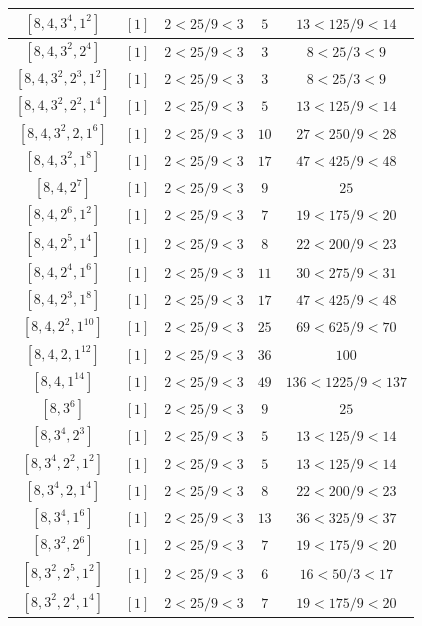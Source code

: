 \documentclass{article}%
\begin{document}
\begin{center}
\begin{longtable}{||c|c|c|c|c||}
$[8, 4, 3^{4}, 1^{2}]$ & $[1]$ & $2 < 25/9 < 3$ & $5$ & $13 < 125/9 < 14$ \\ \hline 
$[8, 4, 3^{2}, 2^{4}]$ & $[1]$ & $2 < 25/9 < 3$ & $3$ & $8 < 25/3 < 9$ \\ \hline 
$[8, 4, 3^{2}, 2^{3}, 1^{2}]$ & $[1]$ & $2 < 25/9 < 3$ & $3$ & $8 < 25/3 < 9$ \\ \hline 
$[8, 4, 3^{2}, 2^{2}, 1^{4}]$ & $[1]$ & $2 < 25/9 < 3$ & $5$ & $13 < 125/9 < 14$ \\ \hline 
$[8, 4, 3^{2}, 2, 1^{6}]$ & $[1]$ & $2 < 25/9 < 3$ & $10$ & $27 < 250/9 < 28$ \\ \hline 
$[8, 4, 3^{2}, 1^{8}]$ & $[1]$ & $2 < 25/9 < 3$ & $17$ & $47 < 425/9 < 48$ \\ \hline 
$[8, 4, 2^{7}]$ & $[1]$ & $2 < 25/9 < 3$ & $9$ & $25$ \\ \hline 
$[8, 4, 2^{6}, 1^{2}]$ & $[1]$ & $2 < 25/9 < 3$ & $7$ & $19 < 175/9 < 20$ \\ \hline 
$[8, 4, 2^{5}, 1^{4}]$ & $[1]$ & $2 < 25/9 < 3$ & $8$ & $22 < 200/9 < 23$ \\ \hline 
$[8, 4, 2^{4}, 1^{6}]$ & $[1]$ & $2 < 25/9 < 3$ & $11$ & $30 < 275/9 < 31$ \\ \hline 
$[8, 4, 2^{3}, 1^{8}]$ & $[1]$ & $2 < 25/9 < 3$ & $17$ & $47 < 425/9 < 48$ \\ \hline 
$[8, 4, 2^{2}, 1^{10}]$ & $[1]$ & $2 < 25/9 < 3$ & $25$ & $69 < 625/9 < 70$ \\ \hline 
$[8, 4, 2, 1^{12}]$ & $[1]$ & $2 < 25/9 < 3$ & $36$ & $100$ \\ \hline 
$[8, 4, 1^{14}]$ & $[1]$ & $2 < 25/9 < 3$ & $49$ & $136 < 1225/9 < 137$ \\ \hline 
$[8, 3^{6}]$ & $[1]$ & $2 < 25/9 < 3$ & $9$ & $25$ \\ \hline 
$[8, 3^{4}, 2^{3}]$ & $[1]$ & $2 < 25/9 < 3$ & $5$ & $13 < 125/9 < 14$ \\ \hline 
$[8, 3^{4}, 2^{2}, 1^{2}]$ & $[1]$ & $2 < 25/9 < 3$ & $5$ & $13 < 125/9 < 14$ \\ \hline 
$[8, 3^{4}, 2, 1^{4}]$ & $[1]$ & $2 < 25/9 < 3$ & $8$ & $22 < 200/9 < 23$ \\ \hline 
$[8, 3^{4}, 1^{6}]$ & $[1]$ & $2 < 25/9 < 3$ & $13$ & $36 < 325/9 < 37$ \\ \hline 
$[8, 3^{2}, 2^{6}]$ & $[1]$ & $2 < 25/9 < 3$ & $7$ & $19 < 175/9 < 20$ \\ \hline 
$[8, 3^{2}, 2^{5}, 1^{2}]$ & $[1]$ & $2 < 25/9 < 3$ & $6$ & $16 < 50/3 < 17$ \\ \hline 
$[8, 3^{2}, 2^{4}, 1^{4}]$ & $[1]$ & $2 < 25/9 < 3$ & $7$ & $19 < 175/9 < 20$ \\ \hline 

\end{longtable}
\end{center}
\end{document}
